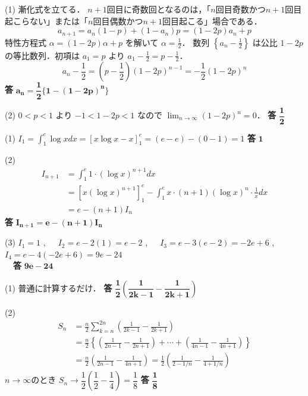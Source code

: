 \documentclass[a4paper,11pt]{ltjsarticle}
\begin{document}
\begin{toi}
(1) 漸化式を立てる．
$n+1$回目に奇数回となるのは，「$n$回目奇数かつ$n+1$回目起こらない」または「$n$回目偶数かつ$n+1$回目起こる」場合である．
\[
a_{n+1} = a_n(1-p) + (1-a_n)p = (1-2p)a_n + p
\]
特性方程式 $\alpha = (1-2p)\alpha + p$ を解いて $\alpha = \frac{1}{2}$．
数列 $\left\{a_n - \frac{1}{2}\right\}$ は公比 $1-2p$ の等比数列．初項は $a_1=p$ より $a_1-\frac{1}{2} = p-\frac{1}{2}$．
\[
a_n - \frac{1}{2} = \left(p-\frac{1}{2}\right)(1-2p)^{n-1} = -\frac{1}{2}(1-2p)^n
\]
\hfill \textbf{答} \quad $\boldsymbol{a_n = \dfrac{1}{2}\{1-(1-2p)^n\}}$

\vspace{1em}

(2) $0<p<1$ より $-1 < 1-2p < 1$ なので $\lim_{n\to\infty}(1-2p)^n = 0$．
\hfill \textbf{答} \quad $\boldsymbol{\dfrac{1}{2}}$
\end{toi}
\newpage
\begin{toi}
(1) $I_1 = \int_1^e \log x dx = [x\log x - x]_1^e = (e-e) - (0-1) = 1$
\hfill \textbf{答} \quad $\boldsymbol{1}$

\vspace{0.5em}

(2) 
\[
\begin{aligned}
I_{n+1} &= \int_1^e 1 \cdot (\log x)^{n+1} dx \\
&= [x(\log x)^{n+1}]_1^e - \int_1^e x \cdot (n+1)(\log x)^n \cdot \frac{1}{x} dx \\
&= e - (n+1)I_n
\end{aligned}
\]
\hfill \textbf{答} \quad $\boldsymbol{I_{n+1} = e - (n+1)I_n}$

\vspace{0.5em}

(3) 
$I_1 = 1$ ,~~~$I_2 = e - 2(1) = e-2$ ,~~~$I_3 = e - 3(e-2) = -2e+6$ ,~~~$I_4 = e - 4(-2e+6) = 9e-24$\\
　\hfill \textbf{答} \quad $\boldsymbol{9e-24}$
\end{toi}

\begin{toi}
(1) 普通に計算するだけ．
\hfill \textbf{答} \quad $\boldsymbol{\dfrac{1}{2}\left(\dfrac{1}{2k-1} - \dfrac{1}{2k+1}\right)}$

\vspace{1em}

(2) 
\[
\begin{aligned}
S_n &= \frac{n}{2} \sum_{k=n}^{2n} \left(\frac{1}{2k-1} - \frac{1}{2k+1}\right) \\
&= \frac{n}{2} \left\{ \left(\frac{1}{2n-1} - \frac{1}{2n+1}\right) + \cdots + \left(\frac{1}{4n-1} - \frac{1}{4n+1}\right) \right\} \\
&= \frac{n}{2} \left( \frac{1}{2n-1} - \frac{1}{4n+1} \right) = \frac{1}{2} \left( \frac{1}{2-1/n} - \frac{1}{4+1/n} \right)
\end{aligned}
\]
$n\to\infty$のとき $S_n\to\dfrac{1}{2}\left(\dfrac{1}{2} - \dfrac{1}{4}\right) = \dfrac{1}{8}$
\hfill \textbf{答} \quad $\boldsymbol{\dfrac{1}{8}}$
\end{toi}
\end{document}
